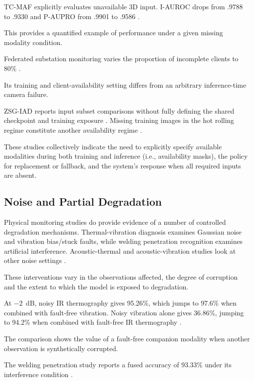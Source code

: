 TC-MAF explicitly evaluates unavailable 3D input. I-AUROC drops from .9788 to .9330 and P-AUPRO from
.9901 to .9586 \parencite[PDF p.~7, Table~3]{P026}.

This provides a quantified example of performance under a given missing modality condition.

Federated substation monitoring varies the proportion of incomplete clients to 80\% \parencite[Figure~8]{P051}.

Its training and client-availability setting differs from an arbitrary inference-time camera
failure.

ZSG-IAD reports input subset comparisons without fully defining the shared checkpoint and training
exposure \parencite{P025}. Missing training images in the hot rolling regime constitute another
availability regime \parencite{Ma2025A}.

These studies collectively indicate the need to explicitly specify available modalities during both
training and inference (i.e., availability masks), the policy for replacement or fallback, and the
system's response when all required inputs are absent.

\subsection{Noise and Partial Degradation}

Physical monitoring studies do provide evidence of a number of controlled degradation mechanisms.
Thermal-vibration diagnosis examines Gaussian noise and vibration bias/stuck faults, while welding
penetration recognition examines artificial interference. Acoustic-thermal and acoustic-vibration
studies look at other noise settings
\parencite{Huo2022Multisensor,Hua2026Weld,Ying2025Trustworthy,Huang2026Rolling}.

These interventions vary in the observations affected, the degree of corruption and the extent to
which the model is exposed to degradation.

At $-2$~dB, noisy IR thermography gives 95.26\%, which jumps to 97.6\% when combined with fault-free
vibration. Noisy vibration alone gives 36.86\%, jumping to 94.2\% when combined with fault-free IR
thermography \parencite[Table~VIII]{Huo2022Multisensor}.

The comparison shows the value of a fault-free companion modality when another observation is
synthetically corrupted.

The welding penetration study reports a fused accuracy of 93.33\% under its interference condition
\parencite[Table~3]{Hua2026Weld}.

